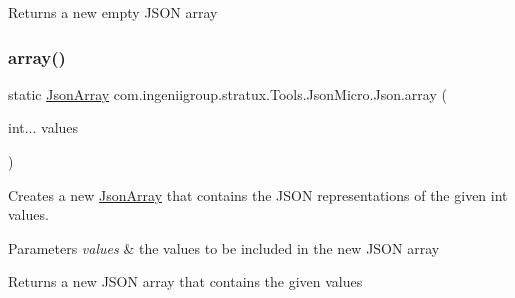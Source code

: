 \begin{DoxyReturn}{Returns}
a new empty J\+S\+ON array 
\end{DoxyReturn}
\mbox{\label{classcom_1_1ingeniigroup_1_1stratux_1_1_tools_1_1_json_micro_1_1_json_ad60b39f91e1c6acc0bd4c865c81c1b1a}} 
\subsubsection{\texorpdfstring{array()}{array()}\hspace{0.1cm}{\footnotesize\ttfamily [2/7]}}
{\footnotesize\ttfamily static \hyperlink{classcom_1_1ingeniigroup_1_1stratux_1_1_tools_1_1_json_micro_1_1_json_array}{Json\+Array} com.\+ingeniigroup.\+stratux.\+Tools.\+Json\+Micro.\+Json.\+array (\begin{DoxyParamCaption}\item[{int...}]{values }\end{DoxyParamCaption})\hspace{0.3cm}{\ttfamily [static]}}

Creates a new \hyperlink{classcom_1_1ingeniigroup_1_1stratux_1_1_tools_1_1_json_micro_1_1_json_array}{Json\+Array} that contains the J\+S\+ON representations of the given {\ttfamily int} values.


\begin{DoxyParams}{Parameters}
{\em values} & the values to be included in the new J\+S\+ON array \\
\hline
\end{DoxyParams}
\begin{DoxyReturn}{Returns}
a new J\+S\+ON array that contains the given values 
\end{DoxyReturn}
\mbox{\label{classcom_1_1ingeniigroup_1_1stratux_1_1_tools_1_1_json_micro_1_1_json_a9b81cc600aacf7cd3f3d48144bc1802d}} 

